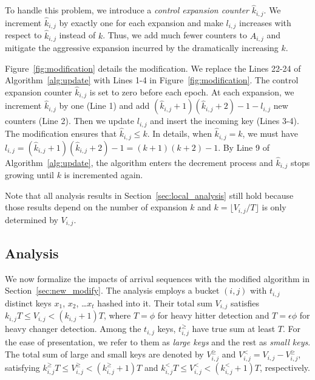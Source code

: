 To handle this problem, we introduce a {\em control expansion counter} $\hat{k}_{i,j}$.
We increment $\hat{k}_{i,j}$ by exactly one for each expansion and make $l_{i,j}$ increases with respect to $\hat{k}_{i,j}$ instead of $k$.
Thus, we add much fewer counters to $A_{i,j}$ and mitigate the aggressive expansion incurred by the dramatically increasing $k$.


Figure~\ref{fig:modification} details the modification.
We replace the Lines 22-24 of Algorithm~\ref{alg:update} with Lines 1-4 in Figure~\ref{fig:modification}.
The control expansion counter $\hat{k}_{i,j}$ is set to zero before each epoch.
At each expansion, we increment $\hat{k}_{i,j}$ by one (Line 1) and add $(\hat{k}_{i,j}+1)(\hat{k}_{i,j}+2)-1-l_{i,j}$ new counters (Line 2).
Then we update $l_{i,j}$ and insert the incoming key (Lines 3-4).
The modification ensures that $\hat{k}_{i,j}\le k$. 
In details, when $\hat{k}_{i,j}=k$, we must have $l_{i,j}=(\hat{k}_{i,j}+1)(\hat{k}_{i,j}+2)-1=(k+1)(k+2)-1$. By Line 9 of Algorithm~\ref{alg:update}, the algorithm enters the decrement process and $\hat{k}_{i,j}$ stops growing until $k$ is incremented again.

Note that all analysis results in Section~\ref{sec:local_analysis} still hold because those results depend on the number of expansion $k$ and
$k=\lfloor V_{i,j}/T\rfloor$ is only determined by $V_{i,j}$.

\subsection{Analysis}
\label{sec:new_analysis}

We now formalize the impacts of arrival sequences with the modified algorithm in Section~\ref{sec:new_modify}.
The analysis employs a bucket $(i, j)$ with $t_{i,j}$ distinct keys $x_1$, $x_2$, \dots $x_t$ hashed into it.
Their total sum $V_{i,j}$ satisfies $k_{i,j}T \le V_{i, j} < (k_{i,j}+1)T$,
where $T=\phi$ for heavy hitter detection and $T=\epsilon\phi$ for heavy changer detection.
Among the $t_{i, j}$ keys, $t^{\ge}_{i, j}$ have true sum at least $T$.
For the ease of presentation, we refer to them as {\em large keys} and the rest as {\em small keys}.
The total sum of large and small keys are denoted by $V^{\ge}_{i, j}$ and $V^{<}_{i, j} = V_{i,j}-V^{\ge}_{i, j}$,
satisfying $k^{\ge}_{i,j}T \le V^{\ge}_{i,j} < (k^{\ge}_{i,j}+1)T$ and $k^{<}_{i,j}T \le V^{<}_{i,j} < (k^{<}_{i,j}+1)T$, respectively.

